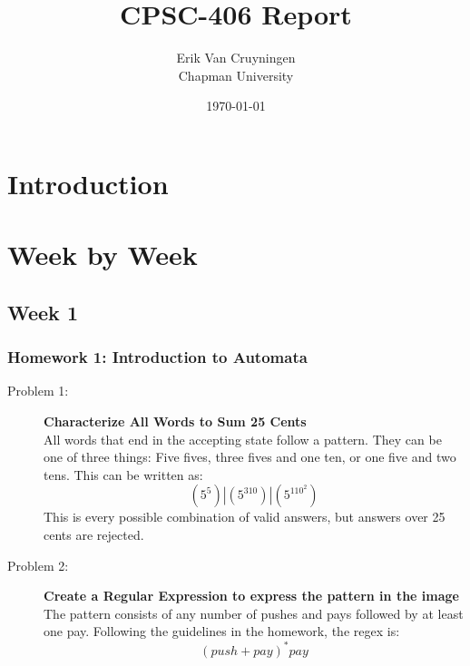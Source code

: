 \documentclass{article}
\title{CPSC-406 Report}
\author{Erik Van Cruyningen  \\ Chapman University}
\date{\today}
\theoremstyle{theorem}
\theoremstyle{definition}
\theoremstyle{remark}
\begin{document}
\maketitle

\begin{abstract}
\end{abstract}

\setcounter{tocdepth}{3}
\tableofcontents

\section{Introduction}\label{intro}

\section{Week by Week}\label{homework}

\subsection{Week 1}

\subsubsection{Homework 1: Introduction to Automata}
\begin{description}
    \item[Problem 1:] \textbf{Characterize All Words to Sum 25 Cents}\\
    All words that end in the accepting state follow a pattern. They can be one of three things: Five fives, three fives and one ten, or one five and two tens. This can be written as:
    $$(5^5) | (5^310) | (5^110^2)$$
    This is every possible combination of valid answers, but answers over 25 cents are rejected.
    
    \item[Problem 2:] \textbf{Create a Regular Expression to express the pattern in the image}\\
    The pattern consists of any number of pushes and pays followed by at least one pay. Following the guidelines in the homework, the regex is:
    \[ (push + pay)^* pay \]
\end{description}
\end{document}
